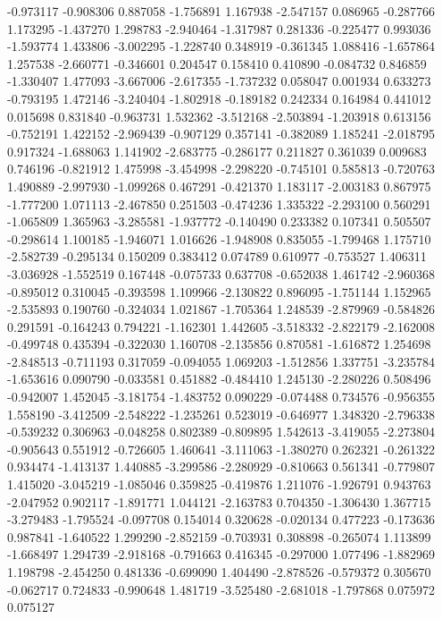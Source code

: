 -0.973117
-0.908306
0.887058
-1.756891
1.167938
-2.547157
0.086965
-0.287766
1.173295
-1.437270
1.298783
-2.940464
-1.317987
0.281336
-0.225477
0.993036
-1.593774
1.433806
-3.002295
-1.228740
0.348919
-0.361345
1.088416
-1.657864
1.257538
-2.660771
-0.346601
0.204547
0.158410
0.410890
-0.084732
0.846859
-1.330407
1.477093
-3.667006
-2.617355
-1.737232
0.058047
0.001934
0.633273
-0.793195
1.472146
-3.240404
-1.802918
-0.189182
0.242334
0.164984
0.441012
0.015698
0.831840
-0.963731
1.532362
-3.512168
-2.503894
-1.203918
0.613156
-0.752191
1.422152
-2.969439
-0.907129
0.357141
-0.382089
1.185241
-2.018795
0.917324
-1.688063
1.141902
-2.683775
-0.286177
0.211827
0.361039
0.009683
0.746196
-0.821912
1.475998
-3.454998
-2.298220
-0.745101
0.585813
-0.720763
1.490889
-2.997930
-1.099268
0.467291
-0.421370
1.183117
-2.003183
0.867975
-1.777200
1.071113
-2.467850
0.251503
-0.474236
1.335322
-2.293100
0.560291
-1.065809
1.365963
-3.285581
-1.937772
-0.140490
0.233382
0.107341
0.505507
-0.298614
1.100185
-1.946071
1.016626
-1.948908
0.835055
-1.799468
1.175710
-2.582739
-0.295134
0.150209
0.383412
0.074789
0.610977
-0.753527
1.406311
-3.036928
-1.552519
0.167448
-0.075733
0.637708
-0.652038
1.461742
-2.960368
-0.895012
0.310045
-0.393598
1.109966
-2.130822
0.896095
-1.751144
1.152965
-2.535893
0.190760
-0.324034
1.021867
-1.705364
1.248539
-2.879969
-0.584826
0.291591
-0.164243
0.794221
-1.162301
1.442605
-3.518332
-2.822179
-2.162008
-0.499748
0.435394
-0.322030
1.160708
-2.135856
0.870581
-1.616872
1.254698
-2.848513
-0.711193
0.317059
-0.094055
1.069203
-1.512856
1.337751
-3.235784
-1.653616
0.090790
-0.033581
0.451882
-0.484410
1.245130
-2.280226
0.508496
-0.942007
1.452045
-3.181754
-1.483752
0.090229
-0.074488
0.734576
-0.956355
1.558190
-3.412509
-2.548222
-1.235261
0.523019
-0.646977
1.348320
-2.796338
-0.539232
0.306963
-0.048258
0.802389
-0.809895
1.542613
-3.419055
-2.273804
-0.905643
0.551912
-0.726605
1.460641
-3.111063
-1.380270
0.262321
-0.261322
0.934474
-1.413137
1.440885
-3.299586
-2.280929
-0.810663
0.561341
-0.779807
1.415020
-3.045219
-1.085046
0.359825
-0.419876
1.211076
-1.926791
0.943763
-2.047952
0.902117
-1.891771
1.044121
-2.163783
0.704350
-1.306430
1.367715
-3.279483
-1.795524
-0.097708
0.154014
0.320628
-0.020134
0.477223
-0.173636
0.987841
-1.640522
1.299290
-2.852159
-0.703931
0.308898
-0.265074
1.113899
-1.668497
1.294739
-2.918168
-0.791663
0.416345
-0.297000
1.077496
-1.882969
1.198798
-2.454250
0.481336
-0.699090
1.404490
-2.878526
-0.579372
0.305670
-0.062717
0.724833
-0.990648
1.481719
-3.525480
-2.681018
-1.797868
0.075972
0.075127
